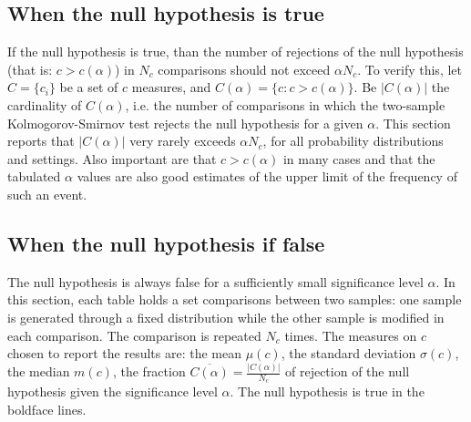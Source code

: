 \documentclass[%
	aip,
	jmp,%
	amsmath,amssymb,
	reprint,%
]{revtex4-1}
\begin{document}
\subsection{When the null hypothesis is true}
If the null hypothesis is true, than the number
of rejections of the null hypothesis (that is: $c>c(\alpha)$)
in $N_c$ comparisons should not exceed $\alpha N_c$.
To verify this, let $C=\{c_i\}$ be a set of $c$ measures,
and $C(\alpha)=\{c : c>c(\alpha)\}$.
Be $|C(\alpha)|$ the cardinality of $C(\alpha)$,
i.e. the number of comparisons in which the two-sample Kolmogorov-Smirnov
test rejects the null hypothesis for a given $\alpha$.
This section reports that
$|C(\alpha)|$ very rarely exceeds $\alpha N_c$,
for all probability distributions and settings.
Also important are that
$c>c(\alpha)$ in many cases
and that the tabulated $\alpha$ values
are also good estimates of the upper limit
of the frequency of such an event.







\FloatBarrier
\subsection{When the null hypothesis if false}
The null hypothesis is always false for a sufficiently small
significance level $\alpha$.
In this section,
each table holds a set comparisons between two samples:
one sample is generated through a
fixed distribution while the other
sample is modified in each comparison.
The comparison is repeated $N_c$ times.
The measures on $c$ chosen to report the results are:
the mean $\mu(c)$, the standard deviation $\sigma(c)$,
the median $m(c)$,
the  fraction
$\overline{C(\alpha)}=\frac{|C(\alpha)|}{N_c}$
of rejection of the null hypothesis given the significance level $\alpha$.
The null hypothesis is true in the boldface lines.







%
%
\end{document}
